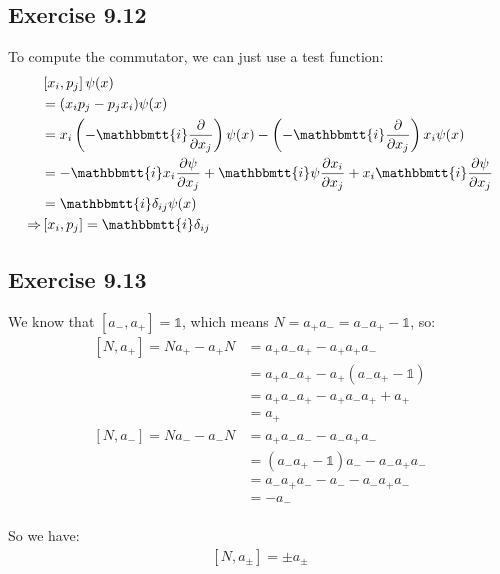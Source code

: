 \documentclass[]{ctexart}
\newcommand{\mi}{\mathbbmtt{i}}
\newcommand{\pa}{\partial}
\begin{document}
	\subsection{Exercise 9.12}
		To compute the commutator, we can just use a test function:
			\begin{equation*}
			\begin{aligned}
				&\left[x_i,p_j\right]\psi(x)\\
				&=(x_ip_j-p_jx_i)\psi(x)\\
				&=x_i \left( -\mi \frac{\pa }{\pa x_j}\right) \psi(x)-\left( -\mi \frac{\pa }{\pa x_j}\right)x_i \psi(x)\\
				&=-\mi x_i \frac{\pa \psi}{\pa x_j}+\mi \psi\frac{\pa x_i}{\pa x_j}+x_i\mi \frac{\pa \psi}{\pa x_j}\\
				&=\mi \delta_{ij} \psi(x)\\
				\Rightarrow &\left[x_i,p_j\right]=\mi \delta_{ij}
			\end{aligned}
			\end{equation*}
			
	\subsection{Exercise 9.13}
		We know that $\left[a_-,a_+\right]=\mathds{1}$, which means $N=a_+a_-=a_-a_+-\mathds{1}$, so:
			\begin{equation*}
			\begin{aligned}
				\left[N,a_+\right]=Na_+-a_+N&=a_+a_-a_+-a_+a_+a_-\\
				&=a_+a_-a_+-a_+(a_-a_+-\mathds{1})\\
				&=a_+a_-a_+-a_+a_-a_++a_+\\
				&=a_+\\
				\left[N,a_-\right]=Na_--a_-N&=a_+a_-a_--a_-a_+a_-\\
				&=(a_-a_+-\mathds{1})a_--a_-a_+a_-\\
				&=a_-a_+a_--a_--a_-a_+a_-\\
				&=-a_-\\
			\end{aligned}
			\end{equation*}
	
		So we have:
			\begin{equation*}
			\begin{aligned}
				\left[N, a_{\pm}\right]=\pm a_{\pm}
			\end{aligned}
			\end{equation*}
\end{document}
